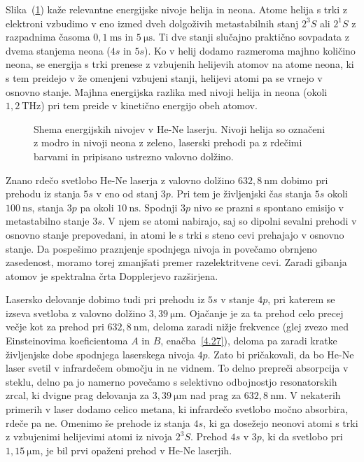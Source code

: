 Slika~(\ref{fig:HeNeE}) kaže relevantne energijske nivoje helija in neona. Atome helija
s trki z elektroni vzbudimo v eno izmed dveh dolgoživih metastabilnih stanj $2^3S$ ali
$2^1S$ z razpadnima časoma $0,1~\si{\milli\second}$ in $5~\si{\micro\second}$.
Ti dve stanji slučajno praktično sovpadata z dvema stanjema neona ($4s$ in $5s$). 
Ko v helij dodamo razmeroma majhno količino neona, se energija s trki 
prenese z vzbujenih helijevih atomov na atome neona, ki s tem preidejo v 
že omenjeni vzbujeni stanji, helijevi atomi pa se vrnejo v osnovno stanje. 
Majhna energijska razlika med nivoji helija in neona (okoli $1,2~\si{\tera\hertz}$) pri 
tem preide v kinetično energijo obeh atomov. 
\begin{figure}[h]
\centering
\def\svgwidth{100truemm} 

\caption{Shema energijskih nivojev v He-Ne laserju. Nivoji helija so označeni
z modro in nivoji neona z zeleno, laserski prehodi pa z rdečimi barvami in pripisano
ustrezno valovno dolžino.}
\label{fig:HeNeE}
\end{figure}

Znano rdečo svetlobo He-Ne laserja z valovno dolžino $632,8~\si{\nano\metre}$ dobimo 
pri prehodu iz stanja $5s$ v eno od stanj $3p$. Pri tem je življenjski čas 
stanja $5s$ okoli $100~\si{\nano\second}$, stanja $3p$ pa okoli $10~\si{\nano\second}$.
Spodnji $3p$ nivo se prazni s spontano emisijo v metastabilno stanje $3s$. 
V njem se atomi nabirajo, saj so dipolni sevalni prehodi v osnovno stanje prepovedani,
in atomi le s trki s steno cevi prehajajo v osnovno stanje. Da pospešimo
praznjenje spodnjega nivoja in povečamo obrnjeno zasedenost, moramo torej 
zmanjšati premer razelektritvene cevi. Zaradi gibanja atomov je spektralna 
črta Dopplerjevo razširjena. 

Lasersko delovanje dobimo tudi pri prehodu iz $5s$ v stanje $4p$, pri katerem 
se izseva svetloba z valovno dolžino $3,39~\si{\micro\metre}$. 
Ojačanje je za ta prehod celo precej večje kot za
prehod pri $632,8~\si{\nano\metre}$, deloma zaradi nižje frekvence 
(glej zvezo med Einsteinovima koeficientoma $A$ in $B$, enačba~\ref{4.27}), 
deloma pa zaradi kratke življenjske dobe spodnjega laserskega nivoja $4p$. 
Zato bi pričakovali, da bo He-Ne laser svetil v infrardečem območju in ne vidnem. 
To delno prepreči absorpcija v steklu, delno pa jo namerno povečamo s selektivno odbojnostjo
resonatorskih zrcal, ki dvigne prag delovanja za $3,39~\si{\micro\metre}$ 
nad prag za $632,8~\si{\nano\metre}$. V nekaterih primerih v laser dodamo
celico metana, ki infrardečo svetlobo močno absorbira, rdeče pa ne.
Omenimo še prehode iz stanja $4s$, ki ga dosežejo neonovi atomi s trki
z vzbujenimi helijevimi atomi iz nivoja $2^3S$. Prehod $4s$ v $3p$, ki da svetlobo
pri $1,15~\si{\micro\metre}$, je bil prvi opaženi prehod v He-Ne laserjih.

